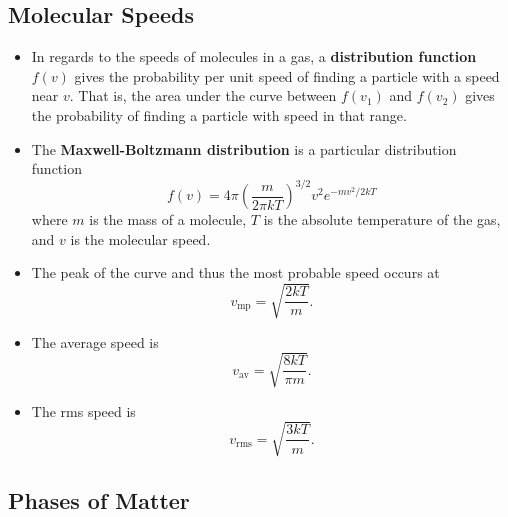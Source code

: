 \documentclass{article}
\begin{document}
\subsection{Molecular Speeds}

\begin{itemize}
  \item In regards to the speeds of molecules in a gas, a \textbf{distribution function} $f(v)$ gives the probability per unit speed of finding a particle with a speed near $v$. That is, the area under the curve between $f(v_1)$ and $f(v_2)$ gives the probability of finding a particle with speed in that range.

  \item The \textbf{Maxwell-Boltzmann distribution} is a particular distribution\\function \[f(v) = 4 \pi \left( \frac{m}{2 \pi k T} \right)^{3 / 2} v^2 e^{-m v^2 / 2 k T}\] where $m$ is the mass of a molecule, $T$ is the absolute temperature of the gas, and $v$ is the molecular speed.

  \item The peak of the curve and thus the most probable speed occurs at \[v_\text{mp} = \sqrt{\frac{2 k T}{m}}.\]

  \item The average speed is \[v_\text{av} = \sqrt{\frac{8 k T}{\pi m}}.\]

  \item The rms speed is \[v_\text{rms} = \sqrt{\frac{3 k T}{m}}.\]
\end{itemize}

\subsection{Phases of Matter}
\end{document}
